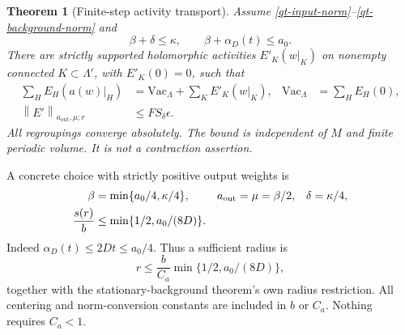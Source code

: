 \documentclass[11pt]{article}
\newtheorem{theorem}{Theorem}[section]
\theoremstyle{remark}
\newcommand{\norm}[1]{\left\|#1\right\|}
\begin{document}
\begin{theorem}[Finite-step activity transport]\label{qt-theorem}
Assume \eqref{qt-input-norm}--\eqref{qt-background-norm} and
\begin{equation}\label{qt-budget}
 \beta+\delta\le\kappa,\qquad
 \beta+\alpha_D(t)\le a_0.
\end{equation}
There are strictly supported holomorphic activities $E'_K(w|_K)$
on nonempty connected $K\subset\Lambda'$, with $E'_K(0)=0$, such that
\begin{align}
 \sum_H E_H(a(w)|_H)
   &=\mathrm{Vac}_\Lambda+\sum_K E'_K(w|_K),
 &\mathrm{Vac}_\Lambda&=\sum_H E_H(0),                 \label{qt-exact-identity}\\
 \norm{E'}_{a_{\mathrm{out}},\mu;r}
   &\le F S_\delta\epsilon.                            \label{qt-transport-bound}
\end{align}
All regroupings converge absolutely. The bound is independent of
$M$ and finite periodic volume. It is not a contraction assertion.
\end{theorem}

A concrete choice with strictly positive output weights is
\begin{align}
 \beta&=\min\{a_0/4,\kappa/4\},
 &a_{\mathrm{out}}&=\mu=\beta/2,
 &\delta&=\kappa/4,\notag\\
 \frac{s(r)}b&\le\min\{1/2,a_0/(8D)\}.                 \label{qt-concrete-budget}
\end{align}
Indeed $\alpha_D(t)\le2Dt\le a_0/4$. Thus a sufficient radius is
\begin{equation}\label{qt-radius}
 r\le\frac b{C_a}\min\{1/2,a_0/(8D)\},
\end{equation}
together with the stationary-background theorem's own radius
restriction. All centering and norm-conversion constants are included
in $b$ or $C_a$. Nothing requires $C_a<1$.
\end{document}
